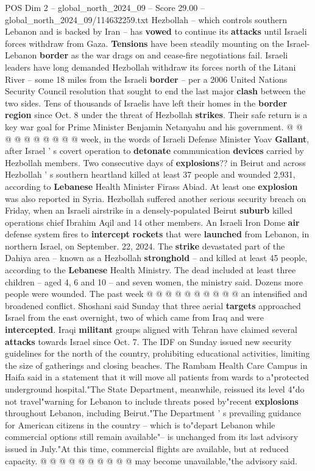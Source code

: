 \begin{textsample}{POS Dim 2 – global\_north\_2024\_09 – Score 29.00 – global\_north\_2024\_09/114632259.txt}
Hezbollah -- which controls southern Lebanon and is backed by Iran -- has \textbf{vowed} to continue its \textbf{attacks} until Israeli forces withdraw from Gaza. \textbf{Tensions} have been steadily mounting on the Israel-Lebanon \textbf{border} as the war drags on and cease-fire negotiations fail.
Israeli leaders have long demanded Hezbollah withdraw its forces north of the Litani River -- some 18 miles from the Israeli \textbf{border} -- per a 2006 United Nations Security Council resolution that sought to end the last major \textbf{clash} between the two sides.
Tens of thousands of Israelis have left their homes in the \textbf{border} \textbf{region} since Oct. 8 under the threat of Hezbollah \textbf{strikes}.
Their safe return is a key war goal for Prime Minister Benjamin Netanyahu and his government. @ @ @ @ @ @ @ @ @ @ week, in the words of Israeli Defense Minister Yoav \textbf{Gallant}, after Israel ' s covert operation to \textbf{detonate} communication \textbf{devices} carried by Hezbollah members.
Two consecutive days of \textbf{explosions}?? in Beirut and across Hezbollah ' s southern heartland killed at least 37 people and wounded 2,931, according to \textbf{Lebanese} Health Minister Firass Abiad.
At least one \textbf{explosion} was also reported in Syria.
Hezbollah suffered another serious security breach on Friday, when an Israeli airstrike in a densely-populated Beirut \textbf{suburb} killed operations chief Ibrahim Aqil and 14 other members.
An Israeli Iron Dome \textbf{air} defense system fires to \textbf{intercept} \textbf{rockets} that were \textbf{launched} from Lebanon, in northern Israel, on September. 22, 2024.
The \textbf{strike} devastated part of the Dahiya area -- known as a Hezbollah \textbf{stronghold} -- and killed at least 45 people, according to the \textbf{Lebanese} Health Ministry.
The dead included at least three children -- aged 4, 6 and 10 -- and seven women, the ministry said.
Dozens more people were wounded.
The past week @ @ @ @ @ @ @ @ @ @ an intensified and broadened conflict.
Shoshani said Sunday that three aerial \textbf{targets} approached Israel from the east overnight, two of which came from Iraq and were \textbf{intercepted}.
Iraqi \textbf{militant} groups aligned with Tehran have claimed several \textbf{attacks} towards Israel since Oct. 7.
The IDF on Sunday issued new security guidelines for the north of the country, prohibiting educational activities, limiting the size of gatherings and closing beaches.
The Rambam Health Care Campus in Haifa said in a statement that it will move all patients from wards to a"protected underground hospital."The State Department, meanwhile, reissued its level 4"do not travel"warning for Lebanon to include threats posed by"recent \textbf{explosions} throughout Lebanon, including Beirut."The Department ' s prevailing guidance for American citizens in the country -- which is to"depart Lebanon while commercial options still remain available"-- is unchanged from its last advisory issued in July."At this time, commercial flights are available, but at reduced capacity. @ @ @ @ @ @ @ @ @ @ may become unavailable,"the advisory said.

\end{textsample}

